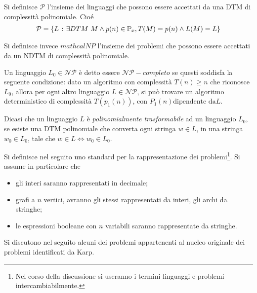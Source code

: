 \documentclass{subfiles}
\begin{document}
\begin{Definition*}
    Si definisce \(\mathcal{P}\) l'insieme dei linguaggi che possono essere accettati da una DTM di complessità polinomiale. Cioé
    \[\begin{aligned}
            \mathcal{P} = \left\{L \operatorname{\: {:} \:} \exists DTM  \ M \land p(n) \in \mathbb{P}_{x}, T(M) = p(n) \land L(M) = L\right\}
        \end{aligned}\]

    \noindent Si definisce invece \(mathcal{NP}\) l'insieme dei problemi che possono essere accettati da un NDTM di complessità polinomiale.
\end{Definition*}

\begin{Definition*}
    Un linguaggio \(L_{0} \in \mathcal{NP}\) è detto essere \(\mathcal{NP}-completo\) se questi soddisfa la seguente condizione:
    dato un algoritmo con complessità \(T(n) \ge n\) che riconosce \(L_{0}\), allora per ogni altro linguaggio \(L \in \mathcal{NP}\),
    si può trovare un algoritmo deterministico di complessità \(T(p_{1}(n))\), con \(P_{1}(n) \text{dipendente da} L\).
\end{Definition*}

\begin{Definition*}
    Dicasi che un linguaggio \(L\) è \emph{polinomialmente trasformabile} ad un linguaggio \(L_{0}\), se esiste una DTM polinomiale che converta ogni stringa \(w \in L\),
    in una stringa \(w_{0} \in L_{0}\), tale che \(w \in L \iff w_{0} \in L_{0}\).
\end{Definition*}

\noindent Si definisce nel seguito uno standard per la rappresentazione dei problemi\footnote[11]{Nel corso della discussione si useranno i termini linguaggi e problemi intercambiabilmente.}.
Si assume in particolare che
\begin{itemize}
    \item gli interi saranno rappresentati in decimale;
    \item grafi a \(n\) vertici, avranno gli stessi rappresentati da interi, gli archi da stringhe;
    \item le espressioni booleane con \(n\) variabili saranno rappresentate da stringhe.
\end{itemize}

\noindent Si discutono nel seguito alcuni dei problemi appartenenti al nucleo originale dei problemi identificati da Karp.
\end{document}
